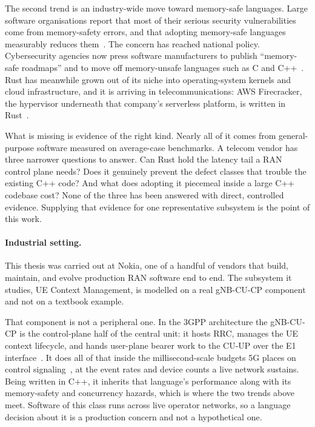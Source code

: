 \documentclass[english,twoside,openright,a4paper,censored,csm,software-track-2020]{HYthesisML}
\begin{document}
The second trend is an industry-wide move toward memory-safe languages. Large software
organisations report that most of their serious security vulnerabilities come from
memory-safety errors, and that adopting memory-safe languages measurably reduces
them~\cite{msrc2019memory,google2022android,google2024securebydesign}. The concern has reached
national policy. Cybersecurity agencies now press software manufacturers to publish
``memory-safe roadmaps'' and to move off memory-unsafe languages such as C and
C++~\cite{cisa2023memorysafe,oncd2024building}. Rust has meanwhile grown out of its niche into
operating-system kernels and cloud infrastructure, and it is arriving in telecommunications:
AWS Firecracker, the hypervisor underneath that company's serverless platform, is written in
Rust~\cite{agache2020firecracker}.

What is missing is evidence of the right kind. Nearly all of it comes from general-purpose
software measured on average-case benchmarks. A telecom vendor has three narrower questions to
answer. Can Rust hold the latency tail a RAN control plane needs? Does it genuinely prevent
the defect classes that trouble the existing C++ code? And what does adopting it piecemeal
inside a large C++ codebase cost? None of the three has been answered with direct, controlled
evidence. Supplying that evidence for one representative subsystem is the point of this work.

\paragraph{Industrial setting.}
This thesis was carried out at Nokia, one of a handful of vendors that build, maintain, and
evolve production RAN software end to end. The subsystem it studies, UE Context Management, is
modelled on a real gNB-CU-CP component and not on a textbook example.

That component is not a peripheral one. In the 3GPP architecture the gNB-CU-CP is the
control-plane half of the central unit: it hosts RRC, manages the UE context lifecycle, and
hands user-plane bearer work to the CU-UP over the E1
interface~\cite{3gpp38401,3gpp38300,3gpp38463,3gpp38331}. It does all of that inside the
millisecond-scale budgets 5G places on control signaling~\cite{3gpp22261}, at the event rates
and device counts a live network sustains. Being written in C++, it inherits that language's
performance along with its memory-safety and concurrency hazards, which is where the two
trends above meet. Software of this class runs across live operator networks, so a language
decision about it is a production concern and not a hypothetical one.
\end{document}
